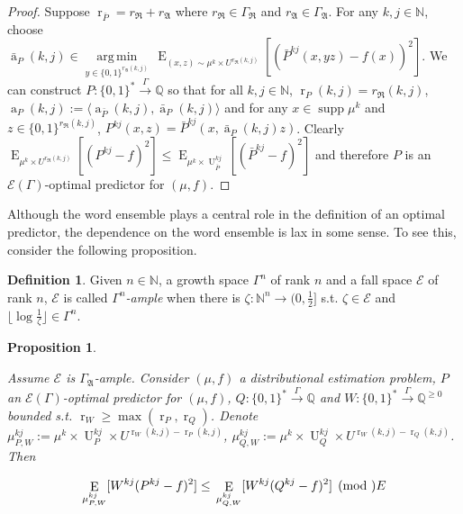 \documentclass{article}
\numberwithin{equation}{section}
\theoremstyle{definition}
\newtheorem{definition}{Definition}[section]
\theoremstyle{plain}
\newtheorem{proposition}{Proposition}[section]
\newcommand{\Bool}{\{0,1\}}
\newcommand{\Words}{{\Bool^*}}
\newcommand{\WordsLen}[1]{{\Bool^{#1}}}
\DeclareMathOperator{\Supp}{supp}
\DeclareMathOperator{\E}{E}
\DeclareMathOperator{\R}{r}
\DeclareMathOperator{\A}{a}
\DeclareMathOperator{\U}{U}
\newcommand{\Argmin}[1]{\underset{#1}{\operatorname{arg\,min}}\,}
\newcommand{\Nats}{\mathbb{N}}
\newcommand{\Rats}{\mathbb{Q}}
\newcommand{\Floor}[1]{\lfloor #1 \rfloor}
\newcommand{\Chev}[1]{\langle #1 \rangle}
\newcommand{\GrowR}{\Gamma_{\mathfrak{R}}}
\newcommand{\GrowA}{\Gamma_{\mathfrak{A}}}
\newcommand{\Fall}{\mathcal{E}}
\newcommand{\Scheme}{\xrightarrow{\Gamma}}
\begin{document}
\begin{proof}

Suppose $\R_{\bar{P}}=r_{\mathfrak{R}}+r_{\mathfrak{A}}$ where $r_{\mathfrak{R}} \in \GrowR$ and $r_{\mathfrak{A}} \in \GrowA$. For any ${k,j \in \Nats}$, choose ${\bar{\A}_P(k,j) \in \Argmin{y \in \WordsLen{r_{\mathfrak{A}}(k,j)}} \E_{(x,z) \sim \mu^k \times U^{r_{\mathfrak{R}}(k,j)}}[(\bar{P}^{kj}(x,yz) - f(x))^2]}$. We can construct $P: \Words \Scheme \Rats$ so that for all $k,j \in \Nats$, $\R_P(k,j) = r_{\mathfrak{R}}(k,j)$, $\A_P(k,j):=\Chev{\A_{\bar{P}}(k,j),\bar{\A}_P(k,j)}$ and for any $x \in \Supp \mu^k$ and $z \in \WordsLen{r_{\mathfrak{R}}(k,j)}$, ${P^{kj}(x,z)=\bar{P}^{kj}(x,\bar{\A}_P(k,j)z)}$. Clearly ${\E_{\mu^k \times U^{r_{\mathfrak{R}}(k,j)}}[(P^{kj} - f)^2] \leq \E_{\mu^k \times \U_{\bar{P}}^{kj}}[(\bar{P}^{kj} - f)^2]}$ and therefore $P$ is an $\Fall(\Gamma)$-optimal predictor for $(\mu,f)$.

\end{proof}

Although the word ensemble plays a central role in the definition of an optimal predictor, the dependence on the word ensemble is lax in some sense. To see this, consider the following proposition.

\begin{definition}

Given $n \in \Nats$, a growth space $\Gamma^n$ of rank $n$ and a fall space $\Fall$ of rank $n$, $\Fall$ is called \emph{$\Gamma^n$-ample} when there is $\zeta: \Nats^n \rightarrow (0,\frac{1}{2}]$ s.t.  $\zeta \in \Fall$ and $\Floor{\log \frac{1}{\zeta}} \in \Gamma^n$.

\end{definition}

\begin{proposition}
\label{prp:weight}

Assume $\Fall$ is $\GrowA$-ample. Consider $(\mu,f)$ a distributional estimation problem, $P$ an $\Fall(\Gamma)$-optimal predictor for $(\mu,f)$, $Q: \Words \Scheme \Rats$ and ${W: \Words \Scheme \Rats^{\geq 0}}$ bounded s.t. $\R_W \geq \max(\R_P, \R_Q)$. Denote ${\mu^{kj}_{P,W}:=\mu^k \times \U_P^{kj} \times U^{\R_W(k,j)-\R_P(k,j)}}$, ${\mu^{kj}_{Q,W}:=\mu^k \times \U_Q^{kj} \times U^{\R_W(k,j)-\R_Q(k,j)}}$. Then

\begin{equation}
\E_{\mu^{kj}_{P,W}}[W^{kj}(P^{kj} - f)^2] \leq \\ \E_{\mu^{kj}_{Q,W}}[W^{kj}(Q^{kj} - f)^2] \pmod \Fall
\end{equation}

\end{proposition}
\end{document}
